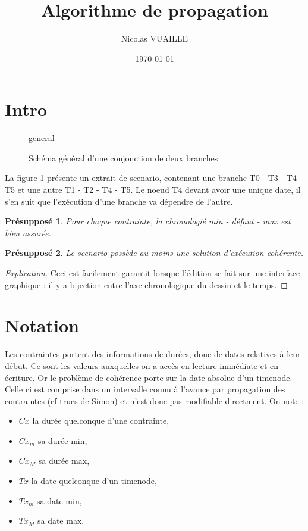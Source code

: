 \documentclass[10pt,a4paper]{article}
\author{Nicolas VUAILLE}
\title{Algorithme de propagation}
\date{\today}
\newtheorem{presup}{Présupposé}
\begin{document}
\maketitle

\section{Intro}

\begin{figure}[h]
\centering
	
	\schemaScenario general
	\caption{Schéma général d'une conjonction de deux branches}
	\label{S:general}
\end{figure}

La figure \ref{S:general} présente un extrait de scenario, contenant une branche T0 - T3 - T4 - T5 et une autre T1 - T2 - T4 - T5. Le noeud T4 devant avoir une unique date, il s'en suit que l'exécution d'une branche va dépendre de l'autre.


\begin{presup}
Pour chaque contrainte, la chronologié min - défaut - max est bien assurée.
\label{P:Chronologie}
\end{presup}

\begin{presup}
Le scenario possède au moins une solution d'exécution cohérente.
\label{P:Executabilite}
\end{presup}
\begin{proof}[Explication]
Ceci est facilement garantit lorsque l'édition se fait sur une interface graphique : il y a bijection entre l'axe chronologique du dessin et le temps.
\end{proof}

\section{Notation}
Les contraintes portent des informations de durées, donc de dates relatives à leur début. Ce sont les valeurs auxquelles on a accès en lecture immédiate et en écriture. Or le problème de cohérence porte sur la date absolue d'un timenode. Celle ci est comprise dans un intervalle connu à l'avance par propagation des contraintes (cf trucs de Simon) et n'est donc pas modifiable directment. On note : 
\begin{itemize}
\item $Cx$ la durée quelconque d'une contrainte,
\item $Cx_m$ sa durée min,
\item $Cx_M$ sa durée max,
\item $Tx$ la date quelconque d'un timenode,
\item $Tx_m$ sa date min,
\item $Tx_M$ sa date max.
\end{itemize}
\end{document}
